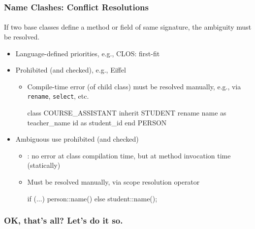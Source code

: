 \documentclass{beamer}
\begin{document}
\begin{frame}[fragile]
\frametitle{Name Clashes: Conflict Resolutions}
\framesubtitle{}

If two base classes define a method or field of same signature,
the ambiguity must be resolved. 

\medskip

\begin{itemize}
\item<+-> Language-defined priorities, e.g., CLOS: first-fit
\item<+-> Prohibited (and checked), e.g., Eiffel
\begin{itemize}
\item Compile-time error (of child class) must be resolved manually,
  e.g., via \texttt{rename}, \texttt{select}, etc.
\begin{eiffel}
class COURSE_ASSISTANT
inherit
      STUDENT
          rename
              name as teacher_name
              id   as student_id
          end
      PERSON
\end{eiffel}
\end{itemize}
\item<+-> Ambiguous \alert{use} prohibited (and checked)
\begin{itemize}
\item \Cpp: no error at class compilation time, but at method invocation
time (statically)
\item Must be resolved manually,  via scope resolution operator
\begin{cplus3}
if (...) person::name() else student::name(); 
\end{cplus3} 
\end{itemize}
\end{itemize}
\end{frame}


\begin{frame}[fragile]
\frametitle{OK, that's all? Let's do it  so.}
\framesubtitle{}
\begin{overlayarea}{\textwidth}{0.55\textheight}\centering
{}
\end{overlayarea}

\end{frame}
\end{document}
